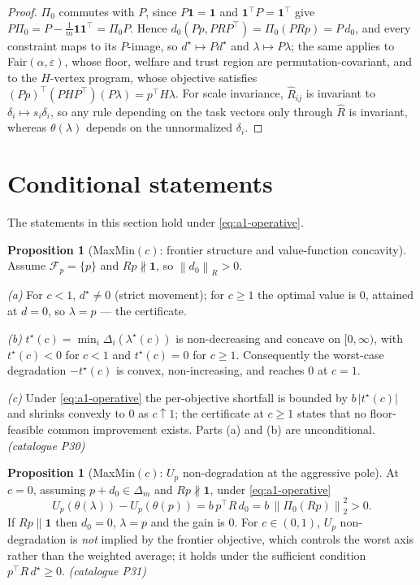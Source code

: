 \documentclass[12pt,a4paper]{report}
\newcommand{\1}{\mathbf{1}}
\newcommand{\norm}[1]{\left\lVert #1 \right\rVert}
\newcommand{\Floor}{\mathcal{F}_{p}}
\newcommand{\Pz}{\Pi_{0}}
\theoremstyle{definition}
\newtheorem{proposition}[definition]{Proposition}
\begin{document}
\begin{proof}
\(\Pz\) commutes with \(P\), since \(P\1=\1\) and \(\1^\top P=\1^\top\) give \(P\Pz=P-\tfrac1m\1\1^\top=\Pz P\). Hence \(d_0(Pp,PRP^\top)=\Pz(PRp)=P\,d_0\), and every constraint maps to its \(P\)-image, so \(d^\star\mapsto Pd^\star\) and \(\lambda\mapsto P\lambda\); the same applies to Fair\((\alpha,\varepsilon)\), whose floor, welfare and trust region are permutation-covariant, and to the \(H\)-vertex program, whose objective satisfies \((Pp)^\top(PHP^\top)(P\lambda)=p^\top H\lambda\). For scale invariance, \(\hat R_{ij}\) is invariant to \(\delta_i\mapsto s_i\delta_i\), so any rule depending on the task vectors only through \(\hat R\) is invariant, whereas \(\theta(\lambda)\) depends on the unnormalized \(\delta_i\).
\end{proof}

\section{Conditional statements}

The statements in this section hold under \eqref{eq:a1-operative}.

\begin{proposition}[MaxMin\((c)\): frontier structure and value-function concavity]
\label{prop:maxmin-frontier}
Assume \(\Floor=\{p\}\) and \(Rp\not\parallel\1\), so \(\norm{d_0}_R>0\).

\emph{(a)} For \(c<1\), \(d^\star\ne0\) (strict movement); for \(c\ge1\) the optimal value is \(0\), attained at \(d=0\), so \(\lambda=p\) --- the certificate.

\emph{(b)} \(t^\star(c)=\min_i\Delta_i(\lambda^\star(c))\) is non-decreasing and concave on \([0,\infty)\), with \(t^\star(c)<0\) for \(c<1\) and \(t^\star(c)=0\) for \(c\ge1\). Consequently the worst-case degradation \(-t^\star(c)\) is convex, non-increasing, and reaches \(0\) at \(c=1\).

\emph{(c)} Under \eqref{eq:a1-operative} the per-objective shortfall is bounded by \(b\,\lvert t^\star(c)\rvert\) and shrinks convexly to \(0\) as \(c\uparrow1\); the certificate at \(c\ge1\) states that no floor-feasible common improvement exists. Parts (a) and (b) are unconditional. \emph{(catalogue P30)}
\end{proposition}

\begin{proposition}[MaxMin\((c)\): \(U_p\) non-degradation at the aggressive pole]
\label{prop:maxmin-aggressive}
At \(c=0\), assuming \(p+d_0\in\Delta_m\) and \(Rp\not\parallel\1\), under \eqref{eq:a1-operative}
\[
U_p(\theta(\lambda))-U_p(\theta(p))=b\,p^\top R\,d_0=b\,\norm{\Pz(Rp)}_2^2>0 .
\]
If \(Rp\parallel\1\) then \(d_0=0\), \(\lambda=p\) and the gain is \(0\). For \(c\in(0,1)\), \(U_p\) non-degradation is \emph{not} implied by the frontier objective, which controls the worst axis rather than the weighted average; it holds under the sufficient condition \(p^\top R\,d^\star\ge0\). \emph{(catalogue P31)}
\end{proposition}
\end{document}
